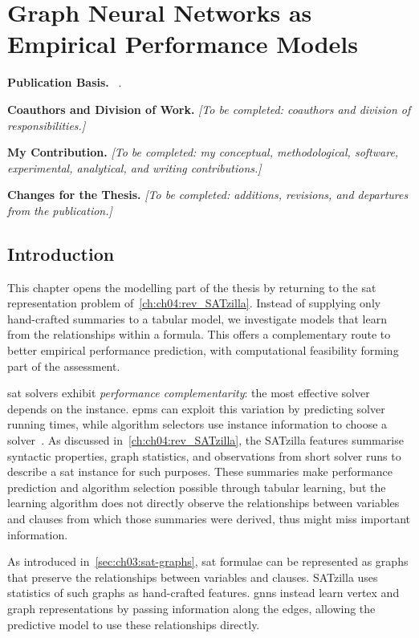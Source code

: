 \chapter{Graph Neural Networks as Empirical Performance Models}
\label{ch:ch07:gnns_epms}
\providecommand{\gb}{GraphBench}

\begingroup\small
\noindent\textbf{Publication Basis.} ~\citep{ShaHoo25b}.\par
\noindent\textbf{Coauthors and Division of Work.} \emph{[To be completed: coauthors and division of responsibilities.]}\par
\noindent\textbf{My Contribution.} \emph{[To be completed: my conceptual, methodological, software, experimental, analytical, and writing contributions.]}\par
\noindent\textbf{Changes for the Thesis.} \emph{[To be completed: additions, revisions, and departures from the publication.]}\par
\endgroup\medskip

\section{Introduction}

This chapter opens the modelling part of the thesis by returning to the \gls{sat} representation problem of~\cref{ch:ch04:rev_SATzilla}. Instead of supplying only hand-crafted summaries to a tabular model, we investigate models that learn from the relationships within a formula. This offers a complementary route to better empirical performance prediction, with computational feasibility forming part of the assessment.

\gls{sat} solvers exhibit \emph{performance complementarity}: the most effective solver depends on the instance. \Glspl{epm} can exploit this variation by predicting solver running times, while algorithm selectors use instance information to choose a solver~\citep{Rice76b,XuEtAl08b,HutEtAl14e}. As discussed in~\cref{ch:ch04:rev_SATzilla}, the SATzilla features summarise syntactic properties, graph statistics, and observations from short solver runs to describe a \gls{sat} instance for such purposes. These summaries make performance prediction and algorithm selection possible through tabular learning, but the learning algorithm does not directly observe the relationships between variables and clauses from which those summaries were derived, thus might miss important information.

As introduced in~\cref{sec:ch03:sat-graphs}, \gls{sat} formulae can be represented as graphs that preserve the relationships between variables and clauses. SATzilla uses statistics of such graphs as hand-crafted features. \Glspl{gnn} instead learn vertex and graph representations by passing information along the edges, allowing the predictive model to use these relationships directly.

